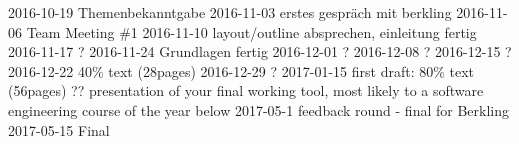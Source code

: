 2016-10-19	Themenbekanntgabe
2016-11-03	erstes gespräch mit berkling
2016-11-06	Team Meeting \#1
2016-11-10	layout/outline absprechen, einleitung fertig
2016-11-17	?
2016-11-24	Grundlagen fertig
2016-12-01	?
2016-12-08	?
2016-12-15	?
2016-12-22	40\% text (28pages)
2016-12-29	?
2017-01-15	first draft: 80\% text  (56pages)
??	presentation of your final working tool, most likely to a software engineering course of the year below
2017-05-1	feedback round - final for Berkling
2017-05-15	Final
